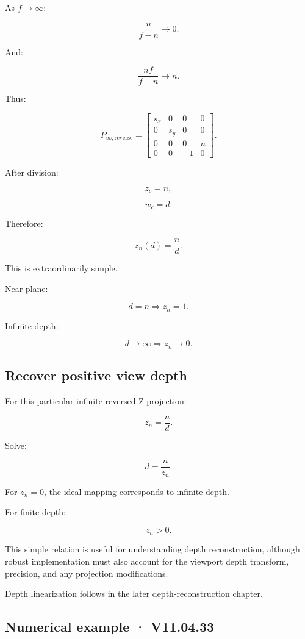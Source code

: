 As \(f\to\infty\):

\[
 \frac n{f-n}\to0.
\]

And:

\[
 \frac{nf}{f-n}\to n.
\]

Thus:

\[
 \boxed{ P_{\infty,\mathrm{reverse}}= \begin{bmatrix} s_x&0&0&0\\ 0&s_y&0&0\\ 0&0&0&n\\ 0&0&-1&0 \end{bmatrix} }.
\]

After division:

\[
 z_c=n,
\]

\[
 w_c=d.
\]

Therefore:

\[
 \boxed{ z_n(d)=\frac nd }.
\]

This is extraordinarily simple.

Near plane:

\[
 d=n\Rightarrow z_n=1.
\]

Infinite depth:

\[
 d\to\infty\Rightarrow z_n\to0.
\]

\subsection{Recover positive view depth}\label{02-foundations-ii-ch033-recover-positive-view-depth}

For this particular infinite reversed-Z projection:

\[
 z_n=\frac nd.
\]

Solve:

\[
 \boxed{ d=\frac n{z_n} }.
\]

For \(z_n=0\), the ideal mapping corresponds to infinite depth.

For finite depth:

\[
 z_n>0.
\]

This simple relation is useful for understanding depth reconstruction, although robust implementation must also account for the viewport depth transform, precision, and any projection modifications.

Depth linearization follows in the later depth-reconstruction chapter.

\subsection{Numerical example · V11.04.33}\label{02-foundations-ii-ch033-numerical-example-v11.04.33}

